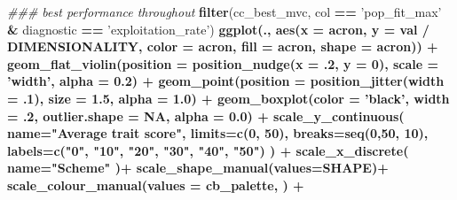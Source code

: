 \documentclass[]{book}
\newenvironment{Shaded}{\begin{snugshade}}{\end{snugshade}}
\newcommand{\CommentTok}[1]{\textcolor[rgb]{0.56,0.35,0.01}{\textit{#1}}}
\newcommand{\DataTypeTok}[1]{\textcolor[rgb]{0.13,0.29,0.53}{#1}}
\newcommand{\DecValTok}[1]{\textcolor[rgb]{0.00,0.00,0.81}{#1}}
\newcommand{\FloatTok}[1]{\textcolor[rgb]{0.00,0.00,0.81}{#1}}
\newcommand{\KeywordTok}[1]{\textcolor[rgb]{0.13,0.29,0.53}{\textbf{#1}}}
\newcommand{\NormalTok}[1]{#1}
\newcommand{\OperatorTok}[1]{\textcolor[rgb]{0.81,0.36,0.00}{\textbf{#1}}}
\newcommand{\OtherTok}[1]{\textcolor[rgb]{0.56,0.35,0.01}{#1}}
\newcommand{\StringTok}[1]{\textcolor[rgb]{0.31,0.60,0.02}{#1}}
\begin{document}
\begin{Shaded}
\begin{Highlighting}[]
\CommentTok{### best performance throughout}
\KeywordTok{filter}\NormalTok{(cc_best_mvc, col }\OperatorTok{==}\StringTok{ 'pop_fit_max'} \OperatorTok{&}\StringTok{ }\NormalTok{diagnostic }\OperatorTok{==}\StringTok{ 'exploitation_rate'}\NormalTok{) }\OperatorTok{%>%}
\StringTok{  }\KeywordTok{ggplot}\NormalTok{(., }\KeywordTok{aes}\NormalTok{(}\DataTypeTok{x =}\NormalTok{ acron, }\DataTypeTok{y =}\NormalTok{ val }\OperatorTok{/}\StringTok{ }\NormalTok{DIMENSIONALITY, }\DataTypeTok{color =}\NormalTok{ acron, }\DataTypeTok{fill =}\NormalTok{ acron, }\DataTypeTok{shape =}\NormalTok{ acron)) }\OperatorTok{+}
\StringTok{  }\KeywordTok{geom_flat_violin}\NormalTok{(}\DataTypeTok{position =} \KeywordTok{position_nudge}\NormalTok{(}\DataTypeTok{x =} \FloatTok{.2}\NormalTok{, }\DataTypeTok{y =} \DecValTok{0}\NormalTok{), }\DataTypeTok{scale =} \StringTok{'width'}\NormalTok{, }\DataTypeTok{alpha =} \FloatTok{0.2}\NormalTok{) }\OperatorTok{+}
\StringTok{  }\KeywordTok{geom_point}\NormalTok{(}\DataTypeTok{position =} \KeywordTok{position_jitter}\NormalTok{(}\DataTypeTok{width =} \FloatTok{.1}\NormalTok{), }\DataTypeTok{size =} \FloatTok{1.5}\NormalTok{, }\DataTypeTok{alpha =} \FloatTok{1.0}\NormalTok{) }\OperatorTok{+}
\StringTok{  }\KeywordTok{geom_boxplot}\NormalTok{(}\DataTypeTok{color =} \StringTok{'black'}\NormalTok{, }\DataTypeTok{width =} \FloatTok{.2}\NormalTok{, }\DataTypeTok{outlier.shape =} \OtherTok{NA}\NormalTok{, }\DataTypeTok{alpha =} \FloatTok{0.0}\NormalTok{) }\OperatorTok{+}
\StringTok{  }\KeywordTok{scale_y_continuous}\NormalTok{(}
    \DataTypeTok{name=}\StringTok{"Average trait score"}\NormalTok{,}
    \DataTypeTok{limits=}\KeywordTok{c}\NormalTok{(}\DecValTok{0}\NormalTok{, }\DecValTok{50}\NormalTok{),}
    \DataTypeTok{breaks=}\KeywordTok{seq}\NormalTok{(}\DecValTok{0}\NormalTok{,}\DecValTok{50}\NormalTok{, }\DecValTok{10}\NormalTok{),}
    \DataTypeTok{labels=}\KeywordTok{c}\NormalTok{(}\StringTok{"0"}\NormalTok{, }\StringTok{"10"}\NormalTok{, }\StringTok{"20"}\NormalTok{, }\StringTok{"30"}\NormalTok{, }\StringTok{"40"}\NormalTok{, }\StringTok{"50"}\NormalTok{)}
\NormalTok{  ) }\OperatorTok{+}
\StringTok{  }\KeywordTok{scale_x_discrete}\NormalTok{(}
    \DataTypeTok{name=}\StringTok{"Scheme"}
\NormalTok{  )}\OperatorTok{+}
\StringTok{  }\KeywordTok{scale_shape_manual}\NormalTok{(}\DataTypeTok{values=}\NormalTok{SHAPE)}\OperatorTok{+}
\StringTok{  }\KeywordTok{scale_colour_manual}\NormalTok{(}\DataTypeTok{values =}\NormalTok{ cb_palette, ) }\OperatorTok{+}
}
\end{Highlighting}
\end{Shaded}
\end{document}
